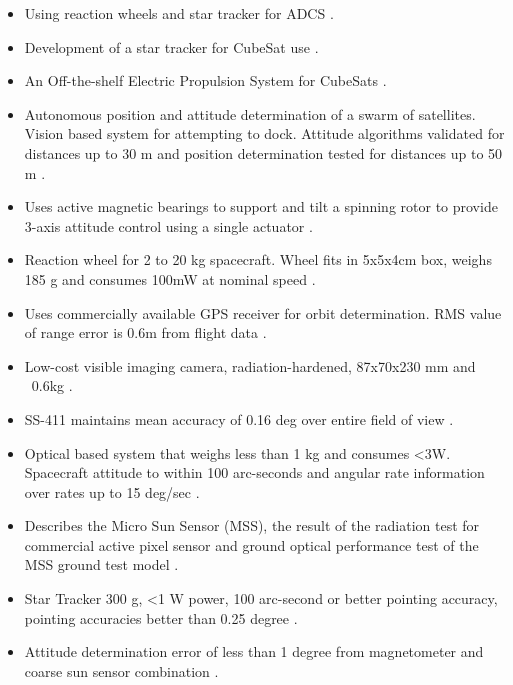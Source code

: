 \begin{itemize}
\item Using reaction wheels and star tracker for ADCS \cite{Lemke}.

\item Development of a star tracker for CubeSat use \cite{Segert}.

\item An Off-the-shelf Electric Propulsion System for CubeSats \cite{Clark}.

\item Autonomous position and attitude determination of a swarm of satellites. Vision based system for attempting to dock. Attitude algorithms validated for distances up to 30 m and position determination tested for distances up to 50 m \cite{Smail}.

\item Uses active magnetic bearings to support and tilt a spinning rotor to provide 3-axis attitude control using a single actuator \cite{Seddon}.

\item Reaction wheel for 2 to 20 kg spacecraft. Wheel fits in 5x5x4cm box, weighs 185 g and consumes 100mW at nominal speed \cite{Sinclair2}.

\item Uses commercially available GPS receiver for orbit determination. RMS value of range error is 0.6m from flight data \cite{Saito}.

\item Low-cost visible imaging camera, radiation-hardened, 87x70x230 mm and ~0.6kg \cite{Shumway}.

\item SS-411 maintains mean accuracy of 0.16 deg over entire field of view \cite{Enright2}.

\item Optical based system that weighs less than 1 kg and consumes <3W. Spacecraft attitude to within 100 arc-seconds and angular rate information over rates up to 15 deg/sec \cite{Seng}.

\item Describes the Micro Sun Sensor (MSS), the result of the radiation test for commercial active pixel sensor and ground optical performance test of the MSS ground test model \cite{Yoshihara}.

\item Star Tracker 300 g, <1 W power, 100 arc-second or better pointing accuracy, pointing accuracies better than 0.25 degree \cite{Zenick}.

\item Attitude determination error of less than 1 degree from magnetometer and coarse sun sensor combination \cite{Theil}.
\end{itemize}


